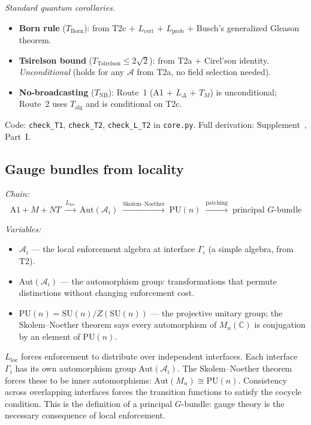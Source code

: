 \documentclass[11pt]{article}
\newcommand{\Lloc}{L_{\mathrm{loc}}}
\newcommand{\Aut}{\mathrm{Aut}}
\newcommand{\SU}{\mathrm{SU}}
\begin{document}
\noindent\textit{Standard quantum corollaries.}
\begin{itemize}[nosep,leftmargin=2em]
\item \textbf{Born rule} ($T_{\mathrm{Born}}$): from T2c $+$ $L_{\mathrm{cert}}$ $+$ $L_{\mathrm{prob}}$ $+$ Busch's generalized Gleason theorem.
\item \textbf{Tsirelson bound} ($T_{\mathrm{Tsirelson}} \le 2\sqrt{2}$): from T2a $+$ Cirel'son identity.  \textit{Unconditional} (holds for any $\mathcal{A}$ from T2a, no field selection needed).
\item \textbf{No-broadcasting} ($T_{\mathrm{NB}}$): Route~1 (A1 $+$ $L_\Delta$ $+$ $T_M$) is unconditional; Route~2 uses $T_{\mathrm{alg}}$ and is conditional on T2c.
\end{itemize}

Code: \texttt{check\_T1}, \texttt{check\_T2}, \texttt{check\_L\_T2} in \texttt{core.py}.  Full derivation: Supplement~\cite{Supp}, Part~I.


\subsection{Gauge bundles from locality}

\begin{tcolorbox}[apfbox, title={T3: Interface Automorphisms $\to$ Gauge Bundle}]
\textit{Chain:}
\begin{equation}
\text{A1} + M + NT \;\xrightarrow{\Lloc}\; \Aut(\mathcal{A}_i) \;\xrightarrow{\text{Skolem--Noether}}\; \text{PU}(n) \;\xrightarrow{\text{patching}}\; \text{principal } G\text{-bundle}
\end{equation}

\smallskip\noindent\textit{Variables:}
\begin{itemize}[nosep,leftmargin=2em]
\item $\mathcal{A}_i$ --- the local enforcement algebra at interface $\Gamma_i$ (a simple algebra, from T2).
\item $\Aut(\mathcal{A}_i)$ --- the automorphism group: transformations that permute distinctions without changing enforcement cost.
\item $\mathrm{PU}(n) = \SU(n)/Z(\SU(n))$ --- the projective unitary group; the Skolem--Noether theorem says every automorphism of $M_n(\mathbb{C})$ is conjugation by an element of $\mathrm{PU}(n)$.
\end{itemize}
\end{tcolorbox}

$\Lloc$ forces enforcement to distribute over independent interfaces.  Each interface $\Gamma_i$ has its own automorphism group $\Aut(\mathcal{A}_i)$.  The Skolem--Noether theorem forces these to be inner automorphisms: $\Aut(M_n) \cong \mathrm{PU}(n)$.  Consistency across overlapping interfaces forces the transition functions to satisfy the cocycle condition.  This is the definition of a principal $G$-bundle: gauge theory is the necessary consequence of local enforcement.
\end{document}
